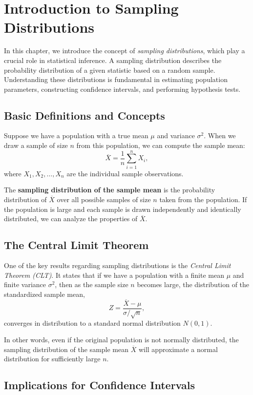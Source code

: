 \chapter{Introduction to Sampling Distributions}

In this chapter, we introduce the concept of \textit{sampling distributions}, which play a crucial role in statistical inference. A sampling distribution describes the probability distribution of a given statistic based on a random sample. Understanding these distributions is fundamental in estimating population parameters, constructing confidence intervals, and performing hypothesis tests.

\section{Basic Definitions and Concepts}

Suppose we have a population with a true mean $\mu$ and variance $\sigma^2$. When we draw a sample of size $n$ from this population, we can compute the sample mean:
\[
\overline{X} = \frac{1}{n}\sum_{i=1}^{n} X_i,
\]
where $X_1, X_2, \ldots, X_n$ are the individual sample observations.

The \textbf{sampling distribution of the sample mean} is the probability distribution of $\overline{X}$ over all possible samples of size $n$ taken from the population. If the population is large and each sample is drawn independently and identically distributed, we can analyze the properties of $\overline{X}$.

\section{The Central Limit Theorem}

One of the key results regarding sampling distributions is the \textit{Central Limit Theorem (CLT)}. It states that if we have a population with a finite mean $\mu$ and finite variance $\sigma^2$, then as the sample size $n$ becomes large, the distribution of the standardized sample mean,
\[
Z = \frac{\overline{X} - \mu}{\sigma/\sqrt{n}},
\]
converges in distribution to a standard normal distribution $N(0,1)$.

In other words, even if the original population is not normally distributed, the sampling distribution of the sample mean $\overline{X}$ will approximate a normal distribution for sufficiently large $n$.

\section{Implications for Confidence Intervals}

